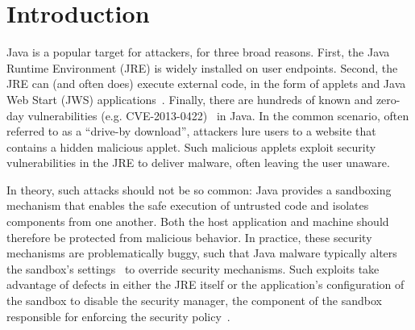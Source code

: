 \documentclass{sig-alternate}
\begin{document}
\section{Introduction}

Java is a popular target for attackers,
for three broad reasons.  First, the Java Runtime Environment (JRE) is widely installed on user endpoints.
Second, the JRE can (and often does) execute external code, in the form of
applets and Java Web Start (JWS) %
applications~\cite{gong1997going,gong2003inside}.  Finally, there are hundreds
of known and zero-day vulnerabilities (e.g. CVE-2013-0422)~\cite{xforceQ12013}
in Java. In the
common scenario, often referred to as a ``drive-by download'', attackers lure
users to a website that contains a hidden malicious applet. Such malicious
applets exploit security vulnerabilities in the JRE to deliver malware,
often leaving the user unaware.

In theory, such attacks should not be so common: 
Java provides a sandboxing mechanism that enables the safe execution of untrusted code and isolates
components from one another. Both the host application and machine should
therefore be protected from malicious behavior.
In practice, these security mechanisms are problematically
buggy, such that Java malware typically alters the sandbox's
settings~\cite{garber_2012} to override security mechanisms. Such exploits take advantage of defects in either
the JRE itself or the application's configuration of the sandbox to 
disable the security manager, the component of the sandbox responsible for enforcing the
security policy~\cite{fireeye_2013,svoboda_anatomy_blog_2013,security_explorations_2012,blackhat_2012}.
\end{document}
